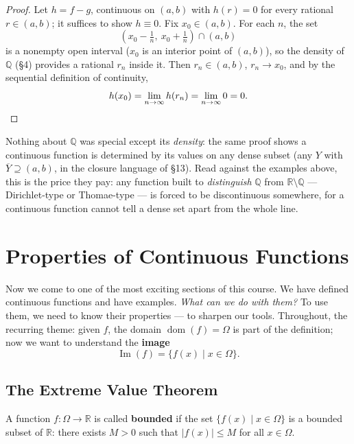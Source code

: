 \documentclass[11pt]{report}
\begin{document}
\begin{proof}
Let $h = f - g$, continuous on $(a,b)$ with $h(r) = 0$ for every rational $r \in (a,b)$; it suffices to show $h \equiv 0$. Fix $x_0 \in (a,b)$. For each $n$, the set
\[
\left( x_0 - \tfrac1n,\ x_0 + \tfrac1n \right) \cap (a,b)
\]
is a nonempty open interval ($x_0$ is an interior point of $(a,b)$), so the density of $\mathbb{Q}$ (\S 4) provides a rational $r_n$ inside it. Then $r_n \in (a,b)$, $r_n \to x_0$, and by the sequential definition of continuity,
\[
h(x_0) = \lim_{n\to\infty} h(r_n) = \lim_{n\to\infty} 0 = 0. \qedhere
\]
\end{proof}

\begin{rembox}
Nothing about $\mathbb{Q}$ was special except its \emph{density}: the same proof shows a continuous function is determined by its values on any dense subset (any $Y$ with $\overline{Y} \supseteq (a,b)$, in the closure language of \S 13). Read against the examples above, this is the price they pay: any function built to \emph{distinguish} $\mathbb{Q}$ from $\mathbb{R}\setminus\mathbb{Q}$ --- Dirichlet-type or Thomae-type --- is forced to be discontinuous somewhere, for a continuous function cannot tell a dense set apart from the whole line.
\end{rembox}


\section{Properties of Continuous Functions}

Now we come to one of the most exciting sections of this course. We have defined continuous functions and have examples. \emph{What can we do with them?} To use them, we need to know their properties --- to sharpen our tools. Throughout, the recurring theme: given $f$, the domain $\operatorname{dom}(f) = \Omega$ is part of the definition; now we want to understand the \textbf{image}
\[
\operatorname{Im}(f) = \{ f(x) \mid x \in \Omega \}.
\]

\subsection{The Extreme Value Theorem}

\begin{defbox}
A function $f: \Omega \to \mathbb{R}$ is called \textbf{bounded} if the set $\{f(x) \mid x \in \Omega\}$ is a bounded subset of $\mathbb{R}$: there exists $M > 0$ such that $|f(x)| \leq M$ for all $x \in \Omega$.
\end{defbox}
\end{document}
